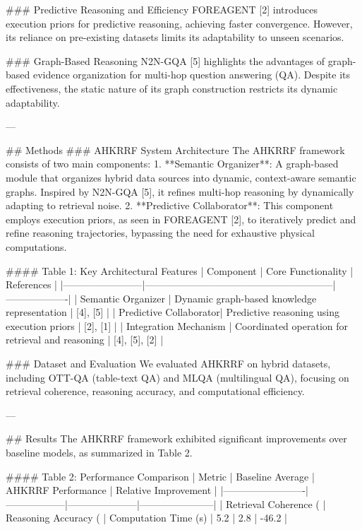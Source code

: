 ### Predictive Reasoning and Efficiency
FOREAGENT [2] introduces execution priors for predictive reasoning, achieving faster convergence. However, its reliance on pre-existing datasets limits its adaptability to unseen scenarios.

### Graph-Based Reasoning
N2N-GQA [5] highlights the advantages of graph-based evidence organization for multi-hop question answering (QA). Despite its effectiveness, the static nature of its graph construction restricts its dynamic adaptability.

---

## Methods
### AHKRRF System Architecture
The AHKRRF framework consists of two main components: 
1. **Semantic Organizer**: A graph-based module that organizes hybrid data sources into dynamic, context-aware semantic graphs. Inspired by N2N-GQA [5], it refines multi-hop reasoning by dynamically adapting to retrieval noise.
2. **Predictive Collaborator**: This component employs execution priors, as seen in FOREAGENT [2], to iteratively predict and refine reasoning trajectories, bypassing the need for exhaustive physical computations.

#### Table 1: Key Architectural Features
| Component              | Core Functionality                                      | References        |
|------------------------|---------------------------------------------------------|-------------------|
| Semantic Organizer     | Dynamic graph-based knowledge representation            | [4], [5]          |
| Predictive Collaborator| Predictive reasoning using execution priors             | [2], [1]          |
| Integration Mechanism  | Coordinated operation for retrieval and reasoning       | [4], [5], [2]     |

### Dataset and Evaluation
We evaluated AHKRRF on hybrid datasets, including OTT-QA (table-text QA) and MLQA (multilingual QA), focusing on retrieval coherence, reasoning accuracy, and computational efficiency.

---

## Results
The AHKRRF framework exhibited significant improvements over baseline models, as summarized in Table 2.

#### Table 2: Performance Comparison
| Metric                  | Baseline Average | AHKRRF Performance | Relative Improvement |
|-------------------------|------------------|---------------------|-----------------------|
| Retrieval Coherence (%
| Reasoning Accuracy (%
| Computation Time (s)    | 5.2              | 2.8                 | -46.2                |

